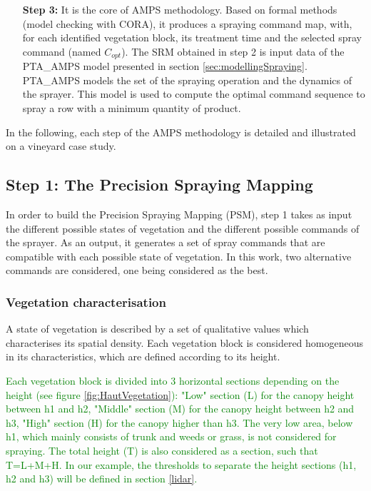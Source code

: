 \documentclass[preprint,3p,times,twocolumn]{elsarticle}
\newcommand{\Rim}[1]{\textcolor{Green}{#1}}
\begin{document}
\begin{itemize}
\item [\textbf{Step 3:}] It is the core of AMPS methodology. Based on formal methods (model checking with CORA), it produces a spraying command map, with, for each identified vegetation block, its treatment time and the selected spray command (named $C_{opt}$). The SRM obtained in step 2 is input data of the PTA\_AMPS model presented in section \ref{sec:modellingSpraying}. PTA\_AMPS models the set of the spraying operation and the dynamics of the sprayer. This model is used to compute the optimal command sequence to spray a row with a minimum quantity of product.

\end{itemize}

In the following, each step of the AMPS methodology is detailed and illustrated on a vineyard case study.


\subsection{Step 1: The Precision Spraying Mapping}
\label{step1}

In order to build the Precision Spraying Mapping (PSM), step 1 takes as input the different possible states of vegetation and the different possible commands of the sprayer. As an output, it generates a set of spray commands that are compatible with each possible state of vegetation. In this work, two alternative commands are considered, one being considered as the best.

\subsubsection{Vegetation characterisation \label{sec:vegcar}}
A state of vegetation is described by a set of qualitative values which characterises its spatial density. Each vegetation block is considered homogeneous in its characteristics, which are defined according to its height. 

\Rim{Each vegetation block is divided into 3 horizontal sections depending on the height (see figure \ref{fig:HautVegetation}): "Low" section (L) for the canopy height between h1 and h2, "Middle" section (M) for the canopy height between h2 and h3, "High" section (H) for the canopy higher than h3. The very low area, below h1, which mainly consists of trunk and weeds or grass, is not considered for spraying. The total height (T) is also considered as a section, such that T=L+M+H. In our example, the thresholds to separate the height sections (h1, h2 and h3) will be defined in section \ref{lidar}.
}
\end{document}
